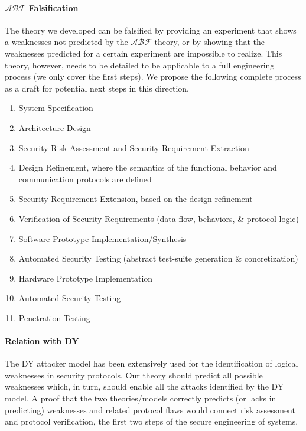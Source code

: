 \documentclass[conference]{IEEEtran}
\newcommand{\assertionRegion}{\mathcal{A}}
\newcommand{\beliefRegion}{\mathcal{B}}
\newcommand{\factRegion}{\mathcal{F}}
\newcommand{\abftheory}{\assertionRegion\beliefRegion\factRegion}
\begin{document}
\paragraph{$\abftheory$ Falsification} The theory we developed can be falsified
by providing an experiment that shows a weaknesses not predicted by the
$\abftheory$-theory, or by showing that the weaknesses predicted for a certain
experiment are impossible to realize.  This theory, however, needs to be
detailed to be applicable to a full engineering process (we only cover the
first steps).  We propose the following complete process as a draft for
potential next steps in this direction.
\begin{enumerate}
\item System Specification
\item Architecture Design
\item Security Risk Assessment and Security Requirement Extraction
\item Design Refinement, where the semantics of the functional behavior and
	communication protocols are defined 
\item Security Requirement Extension, based on the design refinement
\item Verification of Security Requirements (data flow, behaviors, \& protocol
	logic)
\item Software Prototype Implementation/Synthesis
\item Automated Security Testing (abstract test-suite generation \&
	concretization)
\item Hardware Prototype Implementation
\item Automated Security Testing
\item Penetration Testing
  \end{enumerate}

\paragraph{Relation with DY}
The DY attacker model has been extensively
used for the identification of logical weaknesses in security protocols.
Our theory should predict all possible weaknesses which, in turn,
should enable all the attacks identified by the DY model. 
A proof that the two theories/models correctly predicts
(or lacks in predicting) weaknesses and related protocol flaws would
connect risk assessment and protocol verification, the first
two steps of the secure engineering of systems.
\end{document}
